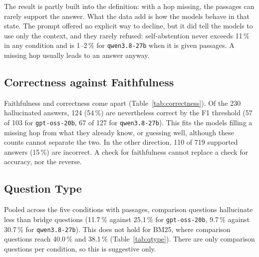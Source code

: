 The result is partly built into the definition: with a hop missing, the passages can rarely support the answer. What
the data add is how the models behave in that state. The prompt offered no explicit way to decline, but it did tell
the models to use only the context, and they rarely refused: self-abstention never exceeds 11\,\% in any condition and
is 1--2\,\% for \texttt{qwen3.8-27b} when it is given passages. A missing hop usually leads to an answer anyway.

\subsection{Correctness against Faithfulness}

\begin{table}[htbp]
\centering\small
\caption{Counts of correct (F1 $\geq$ 0.5) or incorrect answers that were labelled supported or
hallucinated.}\label{tab:correctness}

\end{table}

Faithfulness and correctness come apart (Table~\ref{tab:correctness}). Of the 230 hallucinated answers, 124 (54\,\%)
are nevertheless correct by the F1 threshold (57 of 103 for \texttt{gpt-oss-20b}, 67 of 127 for \texttt{qwen3.8-27b}).
This fits the models filling a missing hop from what they already know, or guessing well, although these counts
cannot separate the two. In the other direction, 110 of 719 supported answers (15\,\%) are incorrect. A check for
faithfulness cannot replace a check for accuracy, nor the reverse.

\subsection{Question Type}

\begin{table}[htbp]
\centering\small
\caption{EM and hallucination rate for bridge and comparison questions. Only
 of the  questions are comparison
questions.}\label{tab:qtype}

\end{table}

Pooled across the five conditions with passages, comparison questions hallucinate less than bridge questions
(11.7\,\% against 25.1\,\% for \texttt{gpt-oss-20b}, 9.7\,\% against 30.7\,\% for \texttt{qwen3.8-27b}). This does not
hold for BM25, where comparison questions reach 40.0\,\% and 38.1\,\% (Table~\ref{tab:qtype}). There are only
 comparison questions per condition, so this is suggestive only.


